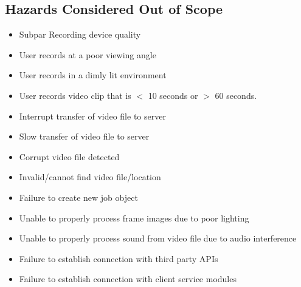 \documentclass{article}
\begin{document}
\subsection{Hazards Considered Out of Scope}
\begin{itemize}
    \item Subpar Recording device quality
    \item User records at a poor viewing angle
    \item User records in a dimly lit environment
    \item User records video clip that is $<$ 10 seconds or $>$ 60 seconds.
    \item Interrupt transfer of video file to server
    \item Slow transfer of video file to server
    \item Corrupt video file detected
    \item Invalid/cannot find video file/location
    \item Failure to create new job object
    \item Unable to properly process frame images due to poor lighting
    \item Unable to properly process sound from video file due to audio interference
    \item Failure to establish connection with third party APIs
    \item Failure to establish connection with client service modules
\end{itemize}
\end{document}
